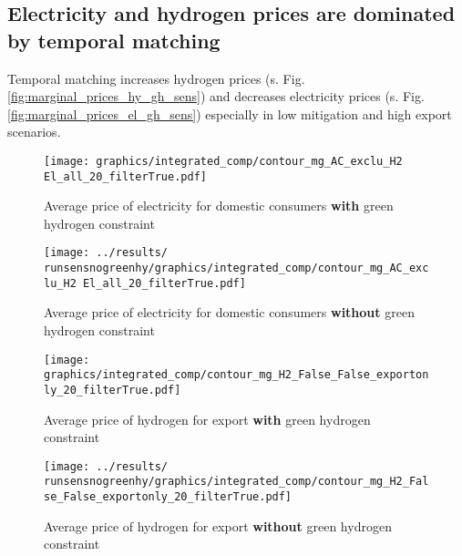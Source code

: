 \subsection{Electricity and hydrogen prices are dominated by temporal matching}
Temporal matching increases hydrogen prices (s. Fig. \ref{fig:marginal_prices_hy_gh_sens}) and decreases electricity prices (s. Fig. \ref{fig:marginal_prices_el_gh_sens}) especially in low mitigation and high export scenarios.


\begin{figure*}[h!] %
    \centering
    \begin{subfigure}[b]{0.49\linewidth}
        \centering
        \texttt{[image: graphics/integrated\_comp/contour\_mg\_AC\_exclu\_H2 El\_all\_20\_filterTrue.pdf]}
        \caption{Average price of electricity for domestic consumers {\bf with} green hydrogen constraint}
        \label{fig:local_el_price}
    \end{subfigure}
    \hfill
    \begin{subfigure}[b]{0.49\linewidth}
        \centering
        \texttt{[image: ../results/\\runsensnogreenhy/graphics/integrated\_comp/contour\_mg\_AC\_exclu\_H2 El\_all\_20\_filterTrue.pdf]}
        \caption{Average price of electricity for domestic consumers {\bf without} green hydrogen constraint}
        \label{fig:local_el_price_nogreen}
    \end{subfigure}
    \hfill
    \caption{Marginal prices of electricity with and without green hydrogen constraint}
    \label{fig:marginal_prices_el_gh_sens}
\end{figure*}


\begin{figure*}[h!] %
    \centering
    \begin{subfigure}[b]{0.49\linewidth}
        \centering
        \texttt{[image: graphics/integrated\_comp/contour\_mg\_H2\_False\_False\_exportonly\_20\_filterTrue.pdf]}
        \caption{Average price of hydrogen for export {\bf with} green hydrogen constraint}
        \label{fig:local_hy_price}
    \end{subfigure}
    \hfill
    \begin{subfigure}[b]{0.49\linewidth}
        \centering
        \texttt{[image: ../results/\\runsensnogreenhy/graphics/integrated\_comp/contour\_mg\_H2\_False\_False\_exportonly\_20\_filterTrue.pdf]}
        \caption{Average price of hydrogen for export {\bf without} green hydrogen constraint}
        \label{fig:local_hy_price_nogreen}
    \end{subfigure}
    \hfill
    \caption{Marginal prices of hydrogen for export with and without green hydrogen constraint}
    \label{fig:marginal_prices_hy_gh_sens}
\end{figure*}

